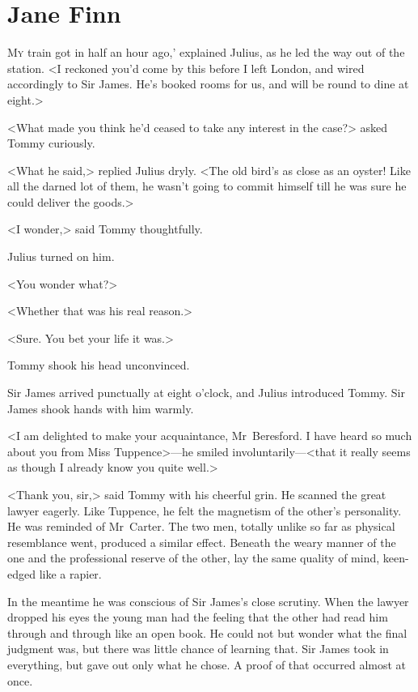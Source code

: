 \chapter{Jane Finn} 

 \lettrine[ante=`]{M}{y}  train got in half an hour ago,' explained Julius, as he led the way out of the station. <I reckoned you'd come by this before I left London, and wired accordingly to Sir James. He's booked rooms for us, and will be round to dine at eight.>

<What made you think he'd ceased to take any interest in the case?> asked Tommy curiously.

<What he said,> replied Julius dryly. <The old bird's as close as an oyster! Like all the darned lot of them, he wasn't going to commit himself till he was sure he could deliver the goods.>

<I wonder,> said Tommy thoughtfully.

Julius turned on him.

<You wonder what?>

<Whether that was his real reason.>

<Sure. You bet your life it was.>

Tommy shook his head unconvinced.

Sir James arrived punctually at eight o'clock, and Julius introduced Tommy. Sir James shook hands with him warmly.

<I am delighted to make your acquaintance, Mr~Beresford. I have heard so much about you from Miss Tuppence>—he smiled involuntarily—<that it really seems as though I already know you quite well.>

<Thank you, sir,> said Tommy with his cheerful grin. He scanned the great lawyer eagerly. Like Tuppence, he felt the magnetism of the other's personality. He was reminded of Mr~Carter. The two men, totally unlike so far as physical resemblance went, produced a similar effect. Beneath the weary manner of the one and the professional reserve of the other, lay the same quality of mind, keen-edged like a rapier.

In the meantime he was conscious of Sir James's close scrutiny. When the lawyer dropped his eyes the young man had the feeling that the other had read him through and through like an open book. He could not but wonder what the final judgment was, but there was little chance of learning that. Sir James took in everything, but gave out only what he chose. A proof of that occurred almost at once.

